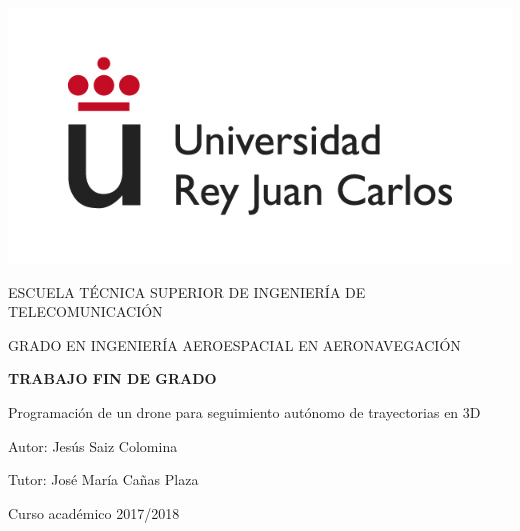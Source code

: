 \documentclass[a4paper, 12pt, oneside]{book}
\begin{document}
\begin{titlepage}
	\begin{center}
		\vspace*{1mm}
		\begin{center}
			\includegraphics[width=0.8\linewidth]{imag/logo.jpg}
		\end{center}
		\vspace{6.5mm}
		
		\fontsize{15.5}{14}\selectfont ESCUELA TÉCNICA SUPERIOR DE INGENIERÍA DE TELECOMUNICACIÓN
		\vspace{8mm}
		
		\fontsize{14}{14}\selectfont GRADO EN INGENIERÍA AEROESPACIAL EN AERONAVEGACIÓN
		
		\vspace{60pt}
		
		\fontsize{15.7}{14}\selectfont \textbf{TRABAJO FIN DE GRADO} 
		
		\vspace{15mm}
		\begin{huge}
			Programación de un drone para seguimiento autónomo de trayectorias en 3D 
		\end{huge}
		
		\vspace{15mm}
		
		\begin{large}
			Autor: Jesús Saiz Colomina
			
			Tutor: José María Cañas Plaza
			
			\vspace{7mm}
		\end{large}
		\begin{normalsize}
			Curso académico 2017/2018		
		\end{normalsize}
	\end{center}
\end{titlepage}

\thispagestyle{empty}
\afterpage{\null\newpage}
\newpage
\end{document}
